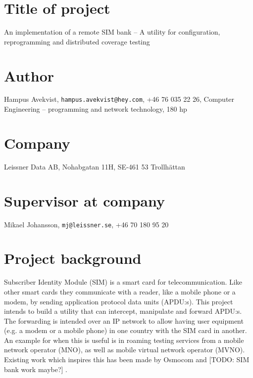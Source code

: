 \documentclass[12pt]{article}
\begin{document}
\thispagestyle{fancy}

\section*{Title of project}
An implementation of a remote SIM bank -- A utility for
configuration, reprogramming and distributed coverage testing

\section*{Author}
Hampus Avekvist,\newline
\verb|hampus.avekvist@hey.com|,\newline
+46 76 035 22 26,\newline
Computer Engineering -- programming and network technology, 180 hp

\section*{Company}
Leissner Data AB,\newline
Nohabgatan 11H, SE-461 53 Trollhättan

\section*{Supervisor at company}
Mikael Johansson,\newline
\verb|mj@leissner.se|,\newline
+46 70 180 95 20

\section*{Project background}

Subscriber Identity Module (SIM) is a smart card for telecommunication.
Like other smart cards they communicate with a reader, like a mobile
phone or a modem, by sending application protocol data units (APDU:s).
This project intends to build a utility that can intercept, manipulate
and forward APDU:s. The forwarding is intended over an IP network to
allow having user equipment (e.g. a modem or a mobile phone) in one
country with the SIM card in another. An example for when this is
useful is in roaming testing services from a mobile network operator
(MNO), as well as mobile virtual network operator (MVNO). Existing
work which inspires this has been made by Osmocom \cite{osmo-remsim}
and [TODO: SIM bank work maybe?] \cite{secondary-source}.
\end{document}
